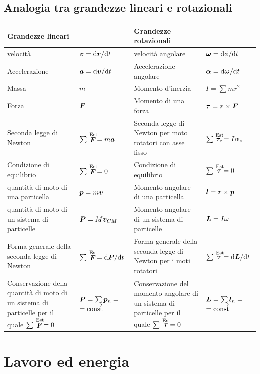 \section{Analogia tra grandezze lineari e \mbox{rotazionali}}
\begin{small}
\begin{tabular}{p{4.0cm}p{2.45cm}p{4.0cm}p{2.38cm}}
\hline
Grandezze lineari &&Grandezze rotazionali&\\
\hline
velocità&$\boldsymbol{v}=\mathrm{d} \boldsymbol{r}/\mathrm{d} t$ & velocità angolare&$\boldsymbol{\omega}=\mathrm{d} \phi/\mathrm{d} t$\\
Accelerazione&$\boldsymbol{a}=\mathrm{d} \boldsymbol{v}/\mathrm{d} t$&Accelerazione
angolare&$\boldsymbol{\alpha}=\mathrm{d} \boldsymbol{\omega}/\mathrm{d} t$\\
Massa&$m$&Momento d'inerzia&$I=\sum mr^2$\\
Forza&$\boldsymbol{F}$&Momento di una forza&$\boldsymbol{\tau}=\boldsymbol{r}\times \boldsymbol{F}$\\
Seconda legge di Newton&$\sum \stackrel{\text{Est}}{\boldsymbol{F}}=m\boldsymbol{a}$& Seconda legge di Newton per moto rotatori con asse
fisso&$\sum\stackrel{\text{Est}}{\boldsymbol{\tau}_z}=I\alpha_z$\\
Condizione di equilibrio&$\sum\stackrel{\text{Est}}{\boldsymbol{F}}=0$&Condizione di equilibrio&$\sum\stackrel{\text{Est}}{\boldsymbol{\tau}}=0$\\
quantità di moto di una particella&$\boldsymbol{p}=m\boldsymbol{v}$&Momento
angolare di una particella&$\boldsymbol{l}=\boldsymbol{r}\times \boldsymbol{p}$\\
quantità di moto di un sistema di particelle&$\boldsymbol{P}=M\boldsymbol{v}_{CM}$&Momento angolare di un sistema di particelle&$\boldsymbol{L}=I\omega$\\
Forma generale della seconda legge di
Newton&$\sum\stackrel{\text{Est}}{\boldsymbol{F}}=\mathrm{d} \boldsymbol{P}/\mathrm{d} t$&Forma
generale della seconda legge di Newton per i moti
rotatori&$\sum\stackrel{\text{Est}}{\boldsymbol{\tau}}=\mathrm{d} \boldsymbol{L}/\mathrm{d} t$\\
Conservazione della quantità di moto di un sistema di particelle
per il quale $\sum\stackrel{\text{Est}}{\boldsymbol{F}}=0$&$\boldsymbol{P}=\sum
\boldsymbol{p}_n=$ \mbox{$=\overrightarrow{\text{const}}$}&Conservazione del momento angolare di un sistema di particelle per il quale $\sum\stackrel{\text{Est}}{\boldsymbol{\tau}}=0$&$\boldsymbol{L}=\sum \boldsymbol{l}_n=$ \mbox{$=\overrightarrow{\text{const}}$}\\
\hline
\end{tabular}
\end{small}

\chapter{Lavoro ed energia}
\minitoc
